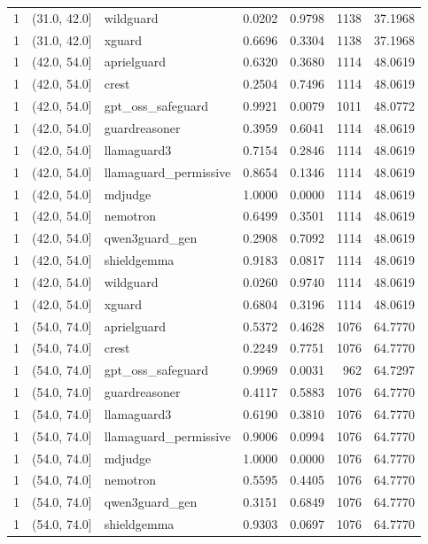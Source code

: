\begin{tabular}{rllrrrr}
1 & (31.0, 42.0] & wildguard & 0.0202 & 0.9798 & 1138 & 37.1968 \\
1 & (31.0, 42.0] & xguard & 0.6696 & 0.3304 & 1138 & 37.1968 \\
1 & (42.0, 54.0] & aprielguard & 0.6320 & 0.3680 & 1114 & 48.0619 \\
1 & (42.0, 54.0] & crest & 0.2504 & 0.7496 & 1114 & 48.0619 \\
1 & (42.0, 54.0] & gpt\_oss\_safeguard & 0.9921 & 0.0079 & 1011 & 48.0772 \\
1 & (42.0, 54.0] & guardreasoner & 0.3959 & 0.6041 & 1114 & 48.0619 \\
1 & (42.0, 54.0] & llamaguard3 & 0.7154 & 0.2846 & 1114 & 48.0619 \\
1 & (42.0, 54.0] & llamaguard\_permissive & 0.8654 & 0.1346 & 1114 & 48.0619 \\
1 & (42.0, 54.0] & mdjudge & 1.0000 & 0.0000 & 1114 & 48.0619 \\
1 & (42.0, 54.0] & nemotron & 0.6499 & 0.3501 & 1114 & 48.0619 \\
1 & (42.0, 54.0] & qwen3guard\_gen & 0.2908 & 0.7092 & 1114 & 48.0619 \\
1 & (42.0, 54.0] & shieldgemma & 0.9183 & 0.0817 & 1114 & 48.0619 \\
1 & (42.0, 54.0] & wildguard & 0.0260 & 0.9740 & 1114 & 48.0619 \\
1 & (42.0, 54.0] & xguard & 0.6804 & 0.3196 & 1114 & 48.0619 \\
1 & (54.0, 74.0] & aprielguard & 0.5372 & 0.4628 & 1076 & 64.7770 \\
1 & (54.0, 74.0] & crest & 0.2249 & 0.7751 & 1076 & 64.7770 \\
1 & (54.0, 74.0] & gpt\_oss\_safeguard & 0.9969 & 0.0031 & 962 & 64.7297 \\
1 & (54.0, 74.0] & guardreasoner & 0.4117 & 0.5883 & 1076 & 64.7770 \\
1 & (54.0, 74.0] & llamaguard3 & 0.6190 & 0.3810 & 1076 & 64.7770 \\
1 & (54.0, 74.0] & llamaguard\_permissive & 0.9006 & 0.0994 & 1076 & 64.7770 \\
1 & (54.0, 74.0] & mdjudge & 1.0000 & 0.0000 & 1076 & 64.7770 \\
1 & (54.0, 74.0] & nemotron & 0.5595 & 0.4405 & 1076 & 64.7770 \\
1 & (54.0, 74.0] & qwen3guard\_gen & 0.3151 & 0.6849 & 1076 & 64.7770 \\
1 & (54.0, 74.0] & shieldgemma & 0.9303 & 0.0697 & 1076 & 64.7770 \\

\end{tabular}
